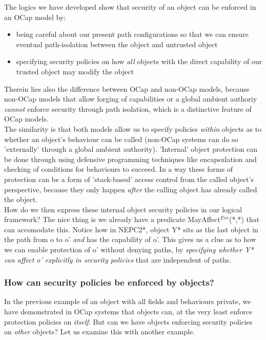 \documentclass[a4paper,11pt, twoside,twocolumn]{article}
\begin{document}
The logics we have developed show that security of an object can be enforced in an OCap model by:
\begin{itemize}
\item being careful about our present path configurations so that we can ensure eventual path-isolation between the object and untrusted object
\item specifying security policies on how \textit{all} objects with the direct capability of our trusted object may modify the object
\end{itemize}
Therein lies also the difference between OCap and non-OCap models, because non-OCap models that allow forging of capabilities or a global ambient authoriy \textit{cannot} enforce security through path isolation, which is a distinctive feature of OCap models.\\

The similarity is that both models allow us to specify policies \textit{within} objects as to whether an object's behaviour can be called (non-OCap systems can do so 'externally' through a global ambient authority). 'Internal' object protection can be done through using defensive programming techniques like encapsulation and checking of conditions for behaviours to succeed. In a way these forms of protection can be a form of 'stack-based' access control from the called object's perspective, because they only happen \textit{after} the calling object has already called the object.\\

How do we then express these internal object security policies in our logical framework? The nice thing is we already have a predicate MayAffect$^{Eve}$(*,*) that can accomodate this. Notice how in \textsc{NEPC2*}, object Y* sits as the last object in the path from o to o' \textit{and} has the capability of o'. This gives us a clue as to how we can enable protection of o' without denying paths, by \textit{specifying whether Y* can affect o' explicitly in security policies} that are independent of paths.



\subsubsection{How can security policies be enforced by objects?}
In the previous example of an object with all fields and behaviours private, we have demonstrated in OCap systems that objects can, at the very least enforce protection policies on \textit{itself}. But can we have objects enforcing security policies on \textit{other} objects? Let us examine this with another example.\\
\end{document}
